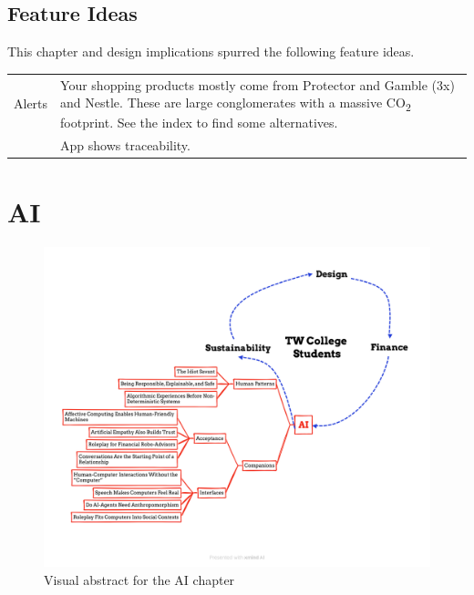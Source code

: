 \documentclass[
  letterpaper,
  DIV=11,
  numbers=noendperiod]{scrartcl}
\begin{document}
\subsection{Feature Ideas}\label{feature-ideas-2}

This chapter and design implications spurred the following feature
ideas.

\begin{longtable}[]{@{}
  >{\raggedright\arraybackslash}p{}
  >{\raggedright\arraybackslash}p{}@{}}
\toprule\noalign{}
\endhead
\bottomrule\noalign{}
\endlastfoot
Alerts & Your shopping products mostly come from Protector and Gamble
(3x) and Nestle. These are large conglomerates with a massive
CO\textsubscript{2} footprint. See the index to find some
alternatives. \\
& App shows traceability. \\
\end{longtable}

\newpage

\section{AI}\label{ai}

\begin{figure}[H]

{\centering \includegraphics{./images/ai/abstract-ai.png}

}

\caption{Visual abstract for the AI chapter}

\end{figure}%
\end{document}

